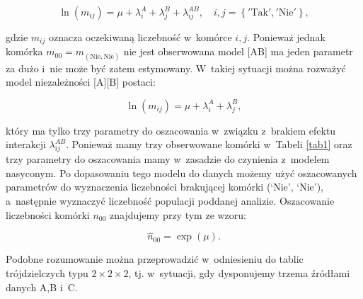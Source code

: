 \documentclass[12pt,a4paper]{article}
\begin{document}
\begin{equation}
\ln \left(m_{ij}\right)=\mu +\lambda^{A}_{i}+\lambda^{B}_{j}+\lambda^{AB}_{ij}, \quad i,j=\left\{\mathrm{'Tak'},\mathrm{'Nie'}\right\},
\end{equation}

\noindent gdzie $m_{ij}$ oznacza oczekiwaną liczebność w~komórce $i,j$. Ponieważ jednak komórka $m_{00}=m_{(\textrm{Nie},\textrm{Nie})}$ nie jest obserwowana model [AB] ma jeden parametr za dużo i~nie może być zatem estymowany. W~takiej sytuacji można rozważyć model niezależności [A][B] postaci:

\begin{equation}
\ln \left(m_{ij}\right)=\mu +\lambda^{A}_{i}+\lambda^{B}_{j},
\end{equation}

\noindent który ma tylko trzy parametry do oszacowania w~związku z~brakiem efektu interakcji $\lambda^{AB}_{ij}$. Ponieważ mamy trzy obserwowane komórki w~Tabeli \ref{tab1} oraz trzy parametry do oszacowania mamy w~zasadzie do czynienia z~modelem nasyconym. Po dopasowaniu tego modelu do danych możemy użyć oszacowanych parametrów do wyznaczenia liczebności brakującej komórki (‘Nie’, ‘Nie’), a~następnie wyznaczyć liczebność populacji poddanej analizie. Oszacowanie liczebności komórki $n_{00}$ znajdujemy przy tym ze wzoru:

\begin{equation}
\hat{n}_{00}=\exp\left(\mu\right).
\end{equation}

Podobne rozumowanie można przeprowadzić w~odniesieniu do tablic trójdzielczych typu $2\times 2\times 2$, tj. w~sytuacji, gdy dysponujemy trzema źródłami danych A,B i~C. 
\end{document}
